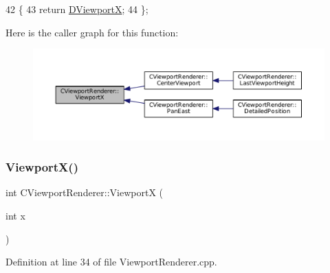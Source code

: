 \begin{DoxyCode}
42                              \{
43             \textcolor{keywordflow}{return} \hyperlink{classCViewportRenderer_aea9e05347f71a8e6b83439aab653be18}{DViewportX};  
44         \};
\end{DoxyCode}
Here is the caller graph for this function\+:
\nopagebreak
\begin{figure}[H]
\begin{center}
\leavevmode
\includegraphics[width=350pt]{classCViewportRenderer_adf6c09ee00cdbf0803e72d59bff9a235_icgraph}
\end{center}
\end{figure}
\hypertarget{classCViewportRenderer_ac81f563649d991e03cc0f35a86dda296}{}\label{classCViewportRenderer_ac81f563649d991e03cc0f35a86dda296} 
\subsubsection{\texorpdfstring{Viewport\+X()}{ViewportX()}\hspace{0.1cm}{\footnotesize\ttfamily [2/2]}}
{\footnotesize\ttfamily int C\+Viewport\+Renderer\+::\+ViewportX (\begin{DoxyParamCaption}\item[{int}]{x }\end{DoxyParamCaption})}



Definition at line 34 of file Viewport\+Renderer.\+cpp.


